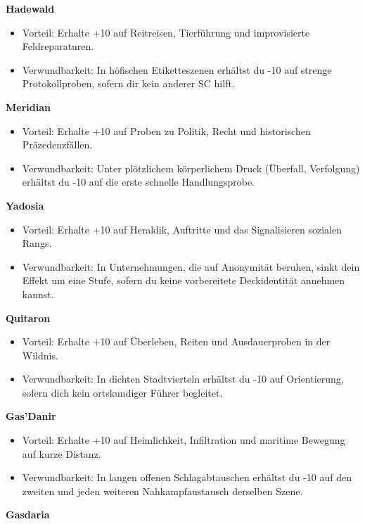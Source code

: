 \noindent\textbf{Hadewald}\par
\begin{itemize}[leftmargin=*,nosep]
\item Vorteil: Erhalte +10 auf Reitreisen, Tierführung und improvisierte Feldreparaturen.
\item Verwundbarkeit: In höfischen Etiketteszenen erhältst du -10 auf strenge Protokollproben, sofern dir kein anderer SC hilft.
\end{itemize}
\noindent\textbf{Meridian}\par
\begin{itemize}[leftmargin=*,nosep]
\item Vorteil: Erhalte +10 auf Proben zu Politik, Recht und historischen Präzedenzfällen.
\item Verwundbarkeit: Unter plötzlichem körperlichem Druck (Überfall, Verfolgung) erhältst du -10 auf die erste schnelle Handlungsprobe.
\end{itemize}
\noindent\textbf{Yadosia}\par
\begin{itemize}[leftmargin=*,nosep]
\item Vorteil: Erhalte +10 auf Heraldik, Auftritte und das Signalisieren sozialen Rangs.
\item Verwundbarkeit: In Unternehmungen, die auf Anonymität beruhen, sinkt dein Effekt um eine Stufe, sofern du keine vorbereitete Deckidentität annehmen kannst.
\end{itemize}
\noindent\textbf{Quitaron}\par
\begin{itemize}[leftmargin=*,nosep]
\item Vorteil: Erhalte +10 auf Überleben, Reiten und Ausdauerproben in der Wildnis.
\item Verwundbarkeit: In dichten Stadtvierteln erhältst du -10 auf Orientierung, sofern dich kein ortskundiger Führer begleitet.
\end{itemize}
\noindent\textbf{Gas'Danir}\par
\begin{itemize}[leftmargin=*,nosep]
\item Vorteil: Erhalte +10 auf Heimlichkeit, Infiltration und maritime Bewegung auf kurze Distanz.
\item Verwundbarkeit: In langen offenen Schlagabtauschen erhältst du -10 auf den zweiten und jeden weiteren Nahkampfaustausch derselben Szene.
\end{itemize}
\noindent\textbf{Gasdaria}\par

